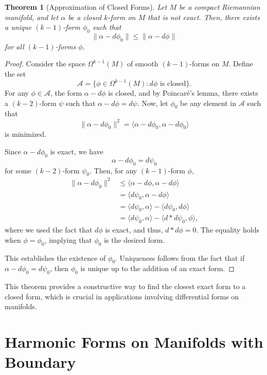 \documentclass[12pt]{article}
\newtheorem{theorem}{Theorem}[section]
\begin{document}
\begin{theorem}[Approximation of Closed Forms]
Let $M$ be a compact Riemannian manifold, and let $\alpha$ be a closed $k$-form on $M$ that is not exact. Then, there exists a unique $(k-1)$-form $\phi_0$ such that
\[
\|\alpha - d\phi_0\| \leq \|\alpha - d\phi\|
\]
for all $(k-1)$-forms $\phi$.
\end{theorem}

\begin{proof}
Consider the space $\Omega^{k-1}(M)$ of smooth $(k-1)$-forms on $M$. Define the set
\[
\mathcal{A} = \{\phi \in \Omega^{k-1}(M) : d\phi \text{ is closed}\}.
\]
For any $\phi \in \mathcal{A}$, the form $\alpha - d\phi$ is closed, and by Poincaré's lemma, there exists a $(k-2)$-form $\psi$ such that $\alpha - d\phi = d\psi$. Now, let $\phi_0$ be any element in $\mathcal{A}$ such that
\[
\|\alpha - d\phi_0\|^2 = \langle \alpha - d\phi_0, \alpha - d\phi_0 \rangle
\]
is minimized.

Since $\alpha - d\phi_0$ is exact, we have
\[
\alpha - d\phi_0 = d\psi_0
\]
for some $(k-2)$-form $\psi_0$. Then, for any $(k-1)$-form $\phi$,
\begin{align*}
\|\alpha - d\phi_0\|^2 &\leq \langle \alpha - d\phi, \alpha - d\phi \rangle \\
&= \langle d\psi_0, \alpha - d\phi \rangle \\
&= \langle d\psi_0, \alpha \rangle - \langle d\psi_0, d\phi \rangle \\
&= \langle d\psi_0, \alpha \rangle - \langle d\ast d\psi_0, \phi \rangle,
\end{align*}
where we used the fact that $d\phi$ is exact, and thus, $d\ast d\phi = 0$. The equality holds when $\phi = \phi_0$, implying that $\phi_0$ is the desired form.

This establishes the existence of $\phi_0$. Uniqueness follows from the fact that if $\alpha - d\phi_0 = d\psi_0$, then $\phi_0$ is unique up to the addition of an exact form.
\end{proof}

This theorem provides a constructive way to find the closest exact form to a closed form, which is crucial in applications involving differential forms on manifolds.



\section{Harmonic Forms on Manifolds with Boundary}
\end{document}
